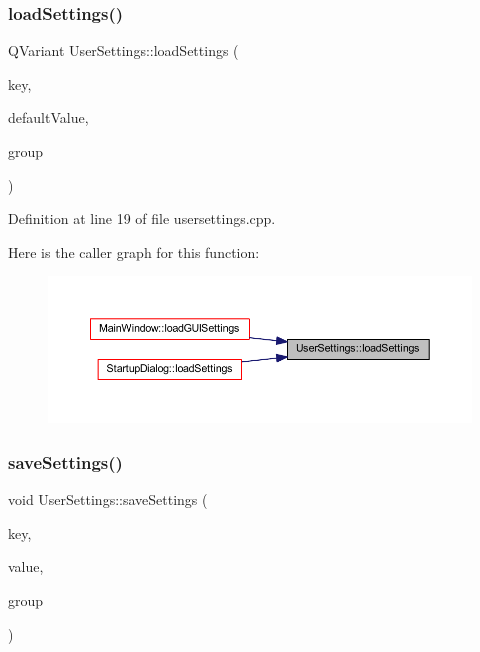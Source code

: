 \subsubsection{\texorpdfstring{loadSettings()}{loadSettings()}}
{\footnotesize\ttfamily Q\+Variant User\+Settings\+::load\+Settings (\begin{DoxyParamCaption}\item[{const Q\+String \&}]{key,  }\item[{const Q\+Variant \&}]{default\+Value,  }\item[{const Q\+String \&}]{group }\end{DoxyParamCaption})\hspace{0.3cm}{\ttfamily [static]}}



Definition at line 19 of file usersettings.\+cpp.

Here is the caller graph for this function\+:
\nopagebreak
\begin{figure}[H]
\begin{center}
\leavevmode
\includegraphics[width=350pt]{classUserSettings_aa58768206ee548c32bf5f89e1ed8c8ba_icgraph}
\end{center}
\end{figure}
\mbox{\label{classUserSettings_a0ec1a38cad81b92041d4024a4862c738}} 
\subsubsection{\texorpdfstring{saveSettings()}{saveSettings()}}
{\footnotesize\ttfamily void User\+Settings\+::save\+Settings (\begin{DoxyParamCaption}\item[{const Q\+String \&}]{key,  }\item[{const Q\+Variant \&}]{value,  }\item[{const Q\+String \&}]{group }\end{DoxyParamCaption})\hspace{0.3cm}{\ttfamily [static]}}



